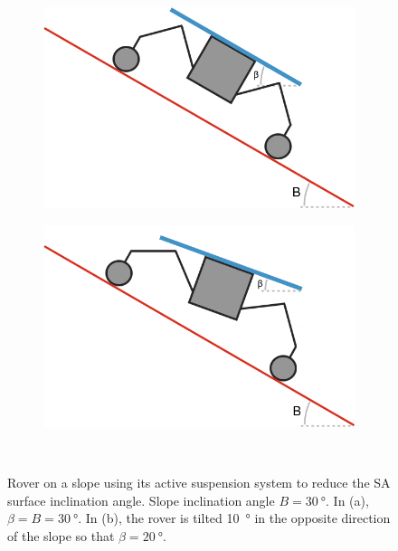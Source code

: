 \begin{figure}[h]
\captionsetup[subfigure]{justification=centering}
\vspace{-2ex}
	\centering
    \setlength{\subfigureWidth}{0.50\textwidth}
    \setlength{\graphicsHeight}{40mm}
    \hypersetup{hidelinks=true}%
    \begin{subfigure}[t]{\subfigureWidth}
        \centering
        \includegraphics[height=\graphicsHeight]{sections/mission-sites/images/stick-rover-beta-large.png}
        \label{fig:sub:rover-on-slope-beta-large}
    \end{subfigure}\hfill
    \begin{subfigure}[t]{\subfigureWidth}
        \centering
        \includegraphics[height=\graphicsHeight]{sections/mission-sites/images/stick-rover-beta-small.png}
		\label{fig:sub:rover-on-slope-beta-small}
	\end{subfigure}\\[0.8ex]
    \caption[Rover on a slope using its active suspension system to reduce the \ac{SA} surface inclination angle]
            {Rover on a slope using its active suspension system to reduce the \ac{SA} surface inclination angle. Slope inclination angle $B = \SI{30}{\degree}$. In (a), $\beta = B = \SI{30}{\degree}$. In (b), the rover is tilted  \SI{10}{\degree} in the opposite direction of the slope so that $\beta = \SI{20}{\degree}$.}
    \label{fig:sub:rover-on-slope-beta}
\vspace{-2ex}
\end{figure}

